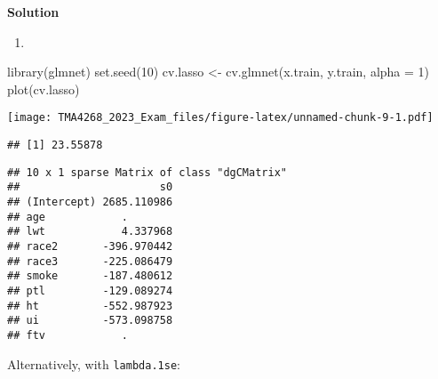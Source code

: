 \documentclass[
]{article}
\newenvironment{Shaded}{\begin{snugshade}}{\end{snugshade}}
\newcommand{\AttributeTok}[1]{\textcolor[rgb]{0.77,0.63,0.00}{#1}}
\newcommand{\DecValTok}[1]{\textcolor[rgb]{0.00,0.00,0.81}{#1}}
\newcommand{\FunctionTok}[1]{\textcolor[rgb]{0.00,0.00,0.00}{#1}}
\newcommand{\NormalTok}[1]{#1}
\newcommand{\OtherTok}[1]{\textcolor[rgb]{0.56,0.35,0.01}{#1}}
\newcommand{\SpecialCharTok}[1]{\textcolor[rgb]{0.00,0.00,0.00}{#1}}
\providecommand{\tightlist}{%
  \setlength{\itemsep}{0pt}\setlength{\parskip}{0pt}}
\begin{document}
\textbf{Solution}

\begin{enumerate}
\def\labelenumi{(\roman{enumi})}
\tightlist
\item
\end{enumerate}

\begin{Shaded}
\begin{Highlighting}[]
\FunctionTok{library}\NormalTok{(glmnet)}
\FunctionTok{set.seed}\NormalTok{(}\DecValTok{10}\NormalTok{)}
\NormalTok{cv.lasso }\OtherTok{\textless{}{-}} \FunctionTok{cv.glmnet}\NormalTok{(x.train, y.train, }\AttributeTok{alpha =} \DecValTok{1}\NormalTok{)}
\FunctionTok{plot}\NormalTok{(cv.lasso)}
\end{Highlighting}
\end{Shaded}

\texttt{[image: TMA4268\_2023\_Exam\_files/figure-latex/unnamed-chunk-9-1.pdf]}

\begin{Shaded}
\end{Shaded}

\begin{verbatim}
## [1] 23.55878
\end{verbatim}

\begin{Shaded}
\end{Shaded}

\begin{verbatim}
## 10 x 1 sparse Matrix of class "dgCMatrix"
##                      s0
## (Intercept) 2685.110986
## age            .       
## lwt            4.337968
## race2       -396.970442
## race3       -225.086479
## smoke       -187.480612
## ptl         -129.089274
## ht          -552.987923
## ui          -573.098758
## ftv            .
\end{verbatim}

Alternatively, with \texttt{lambda.1se}:
\end{document}
